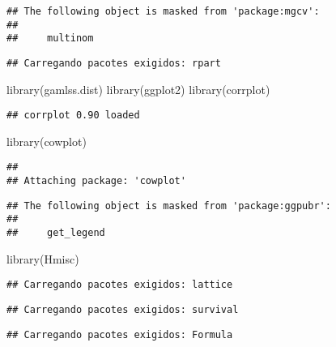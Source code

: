 \documentclass[
]{article}
\newenvironment{Shaded}{\begin{snugshade}}{\end{snugshade}}
\newcommand{\FunctionTok}[1]{\textcolor[rgb]{0.00,0.00,0.00}{#1}}
\newcommand{\NormalTok}[1]{#1}
\begin{document}
\begin{verbatim}
## The following object is masked from 'package:mgcv':
## 
##     multinom
\end{verbatim}

\begin{verbatim}
## Carregando pacotes exigidos: rpart
\end{verbatim}

\begin{Shaded}
\begin{Highlighting}[]
\FunctionTok{library}\NormalTok{(gamlss.dist)}
\FunctionTok{library}\NormalTok{(ggplot2)}
\FunctionTok{library}\NormalTok{(corrplot)}
\end{Highlighting}
\end{Shaded}

\begin{verbatim}
## corrplot 0.90 loaded
\end{verbatim}

\begin{Shaded}
\begin{Highlighting}[]
\FunctionTok{library}\NormalTok{(cowplot)}
\end{Highlighting}
\end{Shaded}

\begin{verbatim}
## 
## Attaching package: 'cowplot'
\end{verbatim}

\begin{verbatim}
## The following object is masked from 'package:ggpubr':
## 
##     get_legend
\end{verbatim}

\begin{Shaded}
\begin{Highlighting}[]
\FunctionTok{library}\NormalTok{(Hmisc)}
\end{Highlighting}
\end{Shaded}

\begin{verbatim}
## Carregando pacotes exigidos: lattice
\end{verbatim}

\begin{verbatim}
## Carregando pacotes exigidos: survival
\end{verbatim}

\begin{verbatim}
## Carregando pacotes exigidos: Formula
\end{verbatim}
\end{document}
